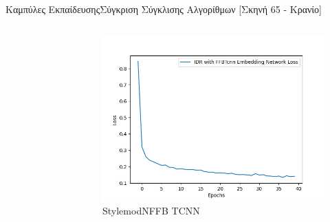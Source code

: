 \documentclass[10pt]{beamer}
\begin{document}
\begin{frame}{Καμπύλες Εκπαίδευσης}{Σύγκριση Σύγκλισης Αλγορίθμων [Σκηνή 65 - Κρανίο]}
\begin{columns}[T]
\begin{figure}
            \end{figure}
         \begin{figure}
            \includegraphics[height = .2\textheight]{images/chapter5_img/LossPlots/Total_Loss_First_50-100_Epochs/loss_plot_FFBTcnn_EpochStamp40.jpg}
            \caption{StylemodNFFB TCNN}
            \end{figure}
    \end{columns}
\end{frame}
\end{document}
